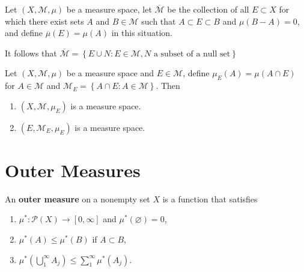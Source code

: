 \documentclass[12pt, a4paper, oneside]{book}
\begin{document}
\begin{definition}[Completion]
    Let $(X,\mathcal{M},\mu)$ be a measure space, let $\overline{\mathcal{M}}$ be the collection of all $E\subset X$ for which there exist sets $A$ and $B\in \mathcal{M}$ such that $A\subset E\subset B$ and $\mu(B-A)=0$, and define $\overline{\mu}(E)=\mu(A)$ in this situation.
    \begin{remark}
        It follows that $\overline{\mathcal{M}}=\left\{E\cup N: E\in \mathcal{M}, N \text{ a subset of a null set}\right\}$
    \end{remark}
\end{definition}



\begin{proposition}
    Let $(X, \mathcal{M}, \mu)$ be a measure space and $E \in \mathcal{M}$, define $\mu_E(A)=\mu(A \cap E)$ for $A \in \mathcal{M}$ and $\mathcal{M}_E=\left\{A\cap E :A \in \mathcal{M}\right\}$.
    Then
    \begin{enumerate}
        \item
              $\left(X,\mathcal{M},\mu_E\right)$ is a measure space.
        \item
              $\left(E,\mathcal{M}_E,\mu_E\right)$ is a measure space.
    \end{enumerate}
\end{proposition}


\section{Outer Measures}

\begin{definition}
    An \textbf{outer measure} on a nonempty set $X$ is a function  that satisfies
    \begin{enumerate}[label=(\roman*)]
        \item
              $\mu^*: \mathcal{P}(X) \rightarrow[0, \infty]$ and $\mu^*(\varnothing)=0$,
        \item
              $\mu^*(A) \leq \mu^*(B)$ if $A \subset B$,
        \item
              $\mu^*\left(\bigcup_1^{\infty} A_j\right) \leq \sum_1^{\infty} \mu^*\left(A_j\right)$.
    \end{enumerate}
\end{definition}
\end{document}
